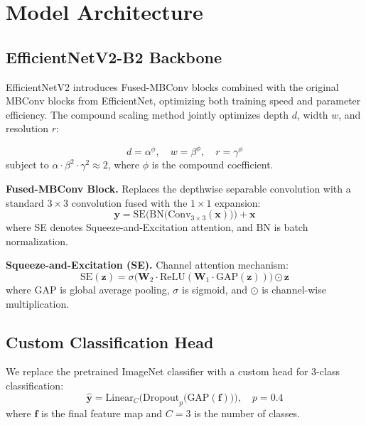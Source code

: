\documentclass[10pt,a4paper,twocolumn]{article}
\begin{document}
\section{Model Architecture}

\subsection{EfficientNetV2-B2 Backbone}

EfficientNetV2 introduces Fused-MBConv blocks combined with the original MBConv blocks from EfficientNet, optimizing both training speed and parameter efficiency. The compound scaling method jointly optimizes depth $d$, width $w$, and resolution $r$:

\begin{equation}
d = \alpha^\phi, \quad w = \beta^\phi, \quad r = \gamma^\phi
\label{eq:compound}
\end{equation}
subject to $\alpha \cdot \beta^2 \cdot \gamma^2 \approx 2$, where $\phi$ is the compound coefficient.

\textbf{Fused-MBConv Block.} Replaces the depthwise separable convolution with a standard $3\times3$ convolution fused with the $1\times1$ expansion:
\begin{equation}
\mathbf{y} = \text{SE}\Big(\text{BN}\big(\text{Conv}_{3\times3}(\mathbf{x})\big)\Big) + \mathbf{x}
\label{eq:fusedmbconv}
\end{equation}
where SE denotes Squeeze-and-Excitation attention, and BN is batch normalization.

\textbf{Squeeze-and-Excitation (SE).} Channel attention mechanism:
\begin{equation}
\text{SE}(\mathbf{z}) = \sigma\big(\mathbf{W}_2 \cdot \text{ReLU}(\mathbf{W}_1 \cdot \text{GAP}(\mathbf{z}))\big) \odot \mathbf{z}
\label{eq:se}
\end{equation}
where GAP is global average pooling, $\sigma$ is sigmoid, and $\odot$ is channel-wise multiplication.

\subsection{Custom Classification Head}

We replace the pretrained ImageNet classifier with a custom head for 3-class classification:
\begin{equation}
\hat{\mathbf{y}} = \text{Linear}_{C}\Big(\text{Dropout}_p\big(\text{GAP}(\mathbf{f})\big)\Big), \quad p=0.4
\label{eq:head}
\end{equation}
where $\mathbf{f}$ is the final feature map and $C=3$ is the number of classes.
\end{document}
